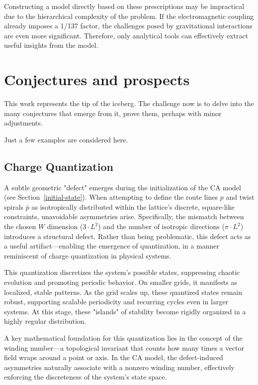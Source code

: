 \documentclass[12pt,english]{article}
\begin{document}
Constructing a model directly based on these prescriptions may be impractical due to the hierarchical complexity of the problem. If the electromagnetic coupling already imposes a 1/137 factor, the challenges posed by gravitational interactions are even more significant. Therefore, only analytical tools can effectively extract useful insights from the model.


\section{Conjectures and prospects\label{sec:Prospects-and-conjectures}}

This work represents the tip of the iceberg. The challenge now is to delve into the many conjectures that emerge from it, prove them, perhaps with minor adjustments.

Just a few examples are considered here.

\subsection{Charge Quantization} \label{subsec:charge-quantization}

A subtle geometric "defect" emerges during the initialization of the CA model (see Section~\ref{initial-state}). When attempting to define the route lines $p$ and twist spirals $\bar{p}$ as isotropically distributed within the lattice's discrete, square-like constraints, unavoidable asymmetries arise. Specifically, the mismatch between the chosen $W$ dimension ($3\cdot L^2$) and the number of isotropic directions ($\pi\cdot L^2$) introduces a structural defect. Rather than being problematic, this defect acts as a useful artifact—enabling the emergence of quantization, in a manner reminiscent of charge quantization in physical systems.

This quantization discretizes the system's possible states, suppressing chaotic evolution and promoting periodic behavior. On smaller grids, it manifests as localized, stable patterns. As the grid scales up, these quantized states remain robust, supporting scalable periodicity and recurring cycles even in larger systems. At this stage, these "islands" of stability become rigidly organized in a highly regular distribution.

A key mathematical foundation for this quantization lies in the concept of the winding number—a topological invariant that counts how many times a vector field wraps around a point or axis. In the CA model, the defect-induced asymmetries naturally associate with a nonzero winding number, effectively enforcing the discreteness of the system’s state space.
\end{document}
